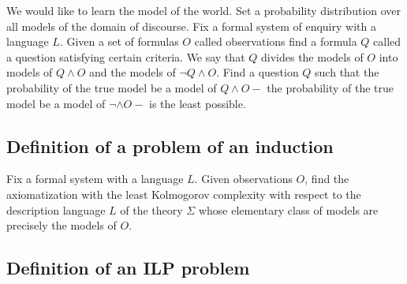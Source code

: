 We would like to learn the model of the world. Set a probability distribution over all models of the domain of discourse. Fix a formal system of enquiry with a language $L$. Given a set of formulas $O$ called observations find a formula $Q$ called a question satisfying certain criteria.
We say that $Q$ divides the models of $O$ into models of $Q \wedge O$ and the models of $\neg Q \wedge O$. Find a question $Q$ such that the probability of the true model be a model of $Q \wedge O \minus$ the probability of the true model be a model of $\neg \wedge O \minus$ is the least possible.

\subsection{Definition of a problem of an induction}
Fix a formal system with a language $L$. Given observations $O$, find the axiomatization with the least Kolmogorov complexity with respect to the description language $L$ of the theory $\Sigma$ whose elementary class of models are precisely the models of $O$.

\subsection{Definition of an ILP problem}
